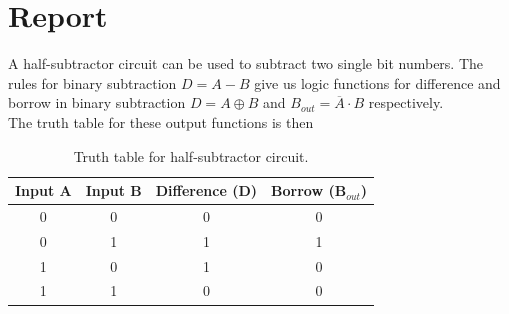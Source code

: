 \documentclass{article}
\begin{document}
	\section*{Report}
	
	A half-subtractor circuit can be used to subtract two single bit numbers. The rules for binary subtraction $D = A-B$ give us logic functions for difference and borrow in binary subtraction $D = A \oplus B$ and $B_{out} = \overline{A}\cdot B$ respectively.\\
	
	The truth table for these output functions is then
	\begin{table}[H]
		\centering
		\begin{tabular}{|c|c|c|c|}
			\hline
			Input A & Input B & Difference (D) & Borrow (B$_{out}$)\\
			\hline
			0 & 0 & 0 & 0\\
			0 & 1 & 1 & 1\\
			1 & 0 & 1 & 0\\
			1 & 1 & 0 & 0\\
			\hline
		\end{tabular}
		\caption{Truth table for half-subtractor circuit.}
	\end{table}
	
\end{document}

